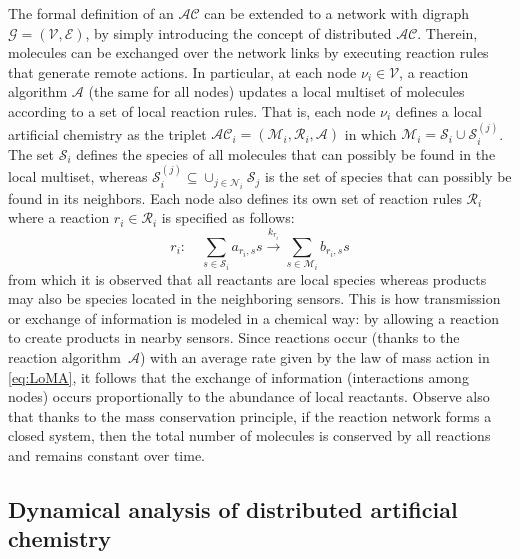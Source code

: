 \documentclass[journal]{IEEEtran}
\newcommand{\artChem}{$\mathcal{AC}$}
\begin{document}
The formal definition of an \artChem{} can be extended to a network with digraph $\mathcal G = (\mathcal V, \mathcal E)$,  {by simply introducing the concept of distributed \artChem{}. Therein, molecules can be} exchanged over the network links by executing reaction rules that generate remote actions. In particular, at each node $\nu_i \in \mathcal V$, a reaction algorithm $\mathcal{A}$ (the same for all nodes) updates a local multiset of molecules according to a set of local reaction rules. That is, each node $\nu_i$ defines a local artificial chemistry as the triplet $\mathcal {AC}_i = (\mathcal M_i, \mathcal R_i, \mathcal A)$ in which $\mathcal M_i = \mathcal{S}_i \cup \mathcal{S}_i^{(j)}$. The set $\mathcal{S}_i$ defines the species of all molecules that can possibly be found in the local multiset, {whereas $\mathcal{S}_i^{(j)} \subseteq \cup_{j\in \mathcal{N}_i}\mathcal{S}_j$} is the set of species that can possibly be found in its neighbors. Each node also defines its own set of reaction rules $\mathcal R_i$ where a reaction $r_i \in \mathcal R_i$ is specified as follows:
\begin{equation}\label{eq:reactDef1}
r_i: \quad \sum\limits_{s \in \mathcal{S}_i} a_{r_i,s} s \mathop \to \limits^{k_{r_i}} \sum\limits_{s \in \mathcal M_i} b_{r_i,s} s
\end{equation}
from which it is observed that all reactants are local species whereas products may also be species located in the neighboring sensors. This is how transmission or exchange of information is modeled in a chemical way: by allowing a reaction to create products in nearby sensors. {Since reactions occur (thanks to the reaction algorithm~$\mathcal{A}$) with an average rate given by the law of mass action in \eqref{eq:LoMA}, it follows that the exchange of information (interactions among nodes) occurs proportionally to the abundance of local reactants.} {Observe also that thanks to the mass conservation principle, if the reaction network forms a closed system, then the total number of molecules is conserved by all reactions and remains constant over time.}



\subsection{Dynamical analysis of distributed artificial chemistry}
\end{document}
